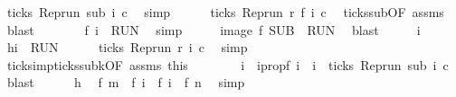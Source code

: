 \begin{isabellebody}
\ {\isacartoucheopen}ticks\ {\isacharparenleft}{\isacharparenleft}Rep{\isacharunderscore}run\ sub{\isacharparenright}\ i\ c{\isacharparenright}{\isacartoucheclose}\ \isamarkupfalse%
\ simp\isanewline
\ \ \ \ \isamarkupfalse%
\ {\isacartoucheopen}ticks\ {\isacharparenleft}{\isacharparenleft}Rep{\isacharunderscore}run\ r{\isacharparenright}\ {\isacharparenleft}f\ i{\isacharparenright}\ c{\isacharparenright}{\isacartoucheclose}\ \isamarkupfalse%
\ ticks{\isacharunderscore}sub{\isacharbrackleft}OF\ assms{\isacharbrackright}\ \isamarkupfalse%
\ blast\isanewline
\ \ \ \ \isamarkupfalse%
\ \isamarkupfalse%
\ {\isacartoucheopen}f\ i\ {\isasymin}\ {\isacharquery}RUN{\isacartoucheclose}\ \isamarkupfalse%
\ simp\isanewline
\ \ \isacommand{{\isacharbraceright}}\isamarkupfalse%
\ \isamarkupfalse%
\ {\isacartoucheopen}image\ f\ {\isacharquery}SUB\ {\isasymsubseteq}\ {\isacharquery}RUN{\isacartoucheclose}\ \isamarkupfalse%
\ blast\isanewline
{}\isamarkupfalse%
\isanewline
\ \ \isacommand{{\isacharbraceleft}}\isamarkupfalse%
\ \isamarkupfalse%
\ i\ \isamarkupfalse%
\ h{\isacharcolon}{\isacartoucheopen}i\ {\isasymin}\ {\isacharquery}RUN{\isacartoucheclose}\isanewline
\ \ \ \ \isamarkupfalse%
\ {\isacartoucheopen}ticks\ {\isacharparenleft}{\isacharparenleft}Rep{\isacharunderscore}run\ r{\isacharparenright}\ i\ c{\isacharparenright}{\isacartoucheclose}\ \isamarkupfalse%
\ simp\isanewline
\ \ \ \ \isamarkupfalse%
\ ticks{\isacharunderscore}imp{\isacharunderscore}ticks{\isacharunderscore}subk{\isacharbrackleft}OF\ assms\ this{\isacharbrackright}\isanewline
\ \ \ \ \ \ \isamarkupfalse%
\ i\ \ i{}prop{\isacharcolon}{\isacartoucheopen}f\ i\ {\isacharequal}\ i\ {\isasymand}\ ticks\ {\isacharparenleft}{\isacharparenleft}Rep{\isacharunderscore}run\ sub{\isacharparenright}\ i\ c{\isacharparenright}{\isacartoucheclose}\ \isamarkupfalse%
\ blast\isanewline
\ \ \ \ \isamarkupfalse%
\ h\ \isamarkupfalse%
\ {\isacartoucheopen}f\ m\ {\isacharless}\ f\ i\ {\isasymand}\ f\ i\ {\isasymle}\ f\ n{\isacartoucheclose}\ \isamarkupfalse%
\ simp\isanewline
\ \ \ \ \isamarkupfalse%
\ \isamarkupfalse%

\end{isabellebody}
